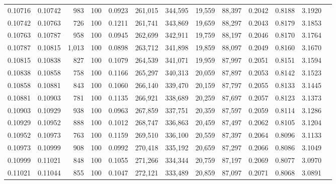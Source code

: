 \begin{tabular}{rrrrrrrrrrrrr}
0.10716 & 0.10742 &   983 & 100 &                                     0.0923 & 261,015 & 344,595 &  19,559 &  88,397 & 0.2042 & 0.8188 & 3.1920 \\
0.10742 & 0.10763 &   726 & 100 &                                     0.1211 & 261,741 & 343,869 &  19,659 &  88,297 & 0.2043 & 0.8179 & 3.1853 \\
0.10763 & 0.10787 &   958 & 100 &                                     0.0945 & 262,699 & 342,911 &  19,759 &  88,197 & 0.2046 & 0.8170 & 3.1764 \\
0.10787 & 0.10815 & 1,013 & 100 &                                     0.0898 & 263,712 & 341,898 &  19,859 &  88,097 & 0.2049 & 0.8160 & 3.1670 \\
0.10815 & 0.10838 &   827 & 100 &                                     0.1079 & 264,539 & 341,071 &  19,959 &  87,997 & 0.2051 & 0.8151 & 3.1594 \\
0.10838 & 0.10858 &   758 & 100 &                                     0.1166 & 265,297 & 340,313 &  20,059 &  87,897 & 0.2053 & 0.8142 & 3.1523 \\
0.10858 & 0.10881 &   843 & 100 &                                     0.1060 & 266,140 & 339,470 &  20,159 &  87,797 & 0.2055 & 0.8133 & 3.1445 \\
0.10881 & 0.10903 &   781 & 100 &                                     0.1135 & 266,921 & 338,689 &  20,259 &  87,697 & 0.2057 & 0.8123 & 3.1373 \\
0.10903 & 0.10929 &   938 & 100 &                                     0.0963 & 267,859 & 337,751 &  20,359 &  87,597 & 0.2059 & 0.8114 & 3.1286 \\
0.10929 & 0.10952 &   888 & 100 &                                     0.1012 & 268,747 & 336,863 &  20,459 &  87,497 & 0.2062 & 0.8105 & 3.1204 \\
0.10952 & 0.10973 &   763 & 100 &                                     0.1159 & 269,510 & 336,100 &  20,559 &  87,397 & 0.2064 & 0.8096 & 3.1133 \\
0.10973 & 0.10999 &   908 & 100 &                                     0.0992 & 270,418 & 335,192 &  20,659 &  87,297 & 0.2066 & 0.8086 & 3.1049 \\
0.10999 & 0.11021 &   848 & 100 &                                     0.1055 & 271,266 & 334,344 &  20,759 &  87,197 & 0.2069 & 0.8077 & 3.0970 \\
0.11021 & 0.11044 &   855 & 100 &                                     0.1047 & 272,121 & 333,489 &  20,859 &  87,097 & 0.2071 & 0.8068 & 3.0891 \\

\end{tabular}
